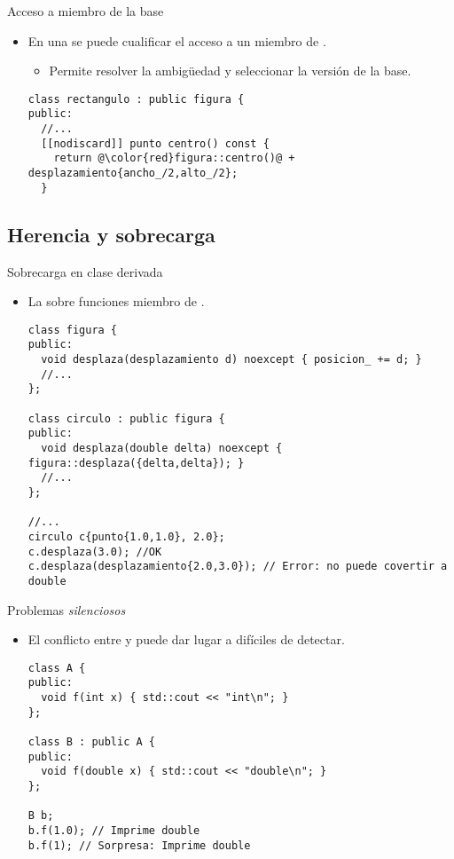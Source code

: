 \begin{frame}[t,fragile]{Acceso a miembro de la base}
\begin{itemize}
  \item En una 
        se puede cualificar el acceso a un miembro de .
    \begin{itemize}
      \item Permite resolver la ambigüedad y seleccionar la versión de la base.
    \end{itemize}
\begin{lstlisting}[escapechar=@]
class rectangulo : public figura {
public:
  //...
  [[nodiscard]] punto centro() const {
    return @\color{red}figura::centro()@ + desplazamiento{ancho_/2,alto_/2};
  }
\end{lstlisting}
\end{itemize}
\end{frame}

\subsection{Herencia y sobrecarga}

\begin{frame}[t,fragile]{Sobrecarga en clase derivada}
\begin{itemize}
  \item La   sobre funciones miembro 
        de .

\begin{lstlisting}
class figura {
public:
  void desplaza(desplazamiento d) noexcept { posicion_ += d; }
  //...
};

class circulo : public figura {
public:
  void desplaza(double delta) noexcept { figura::desplaza({delta,delta}); }
  //...
};

//...
circulo c{punto{1.0,1.0}, 2.0};
c.desplaza(3.0); //OK
c.desplaza(desplazamiento{2.0,3.0}); // Error: no puede covertir a double
\end{lstlisting}
\end{itemize}
\end{frame}

\begin{frame}[t,fragile]{Problemas \emph{silenciosos}}
\begin{itemize}
  \item El conflicto entre  y 
        puede dar lugar a  difíciles de detectar.
\begin{lstlisting}
class A {
public:
  void f(int x) { std::cout << "int\n"; }
};

class B : public A {
public:
  void f(double x) { std::cout << "double\n"; }
};

B b;
b.f(1.0); // Imprime double
b.f(1); // Sorpresa: Imprime double
\end{lstlisting}
\end{itemize}
\end{frame}

